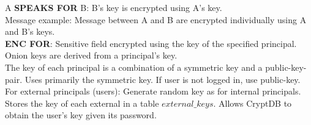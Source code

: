 \documentclass[10pt]{article}
\begin{document}
A \textbf{SPEAKS FOR} B: B's key is encrypted using A's key.\\

Message example: Message between A and B are encrypted individually using A and B's keys.\\

\textbf{ENC FOR}:  Sensitive field encrypted using the key of the specified principal. Onion keys are derived from a principal's key.\\

The key of each principal is a combination of a symmetric key and a public-key-pair. Uses primarily the symmetric key. If user is not logged in, use public-key.\\

For external principals (users): Generate random key as for internal principals. Stores the key of each external in a table $external\_keys$. Allows CryptDB to obtain the user's key given its password. 
\end{document}
